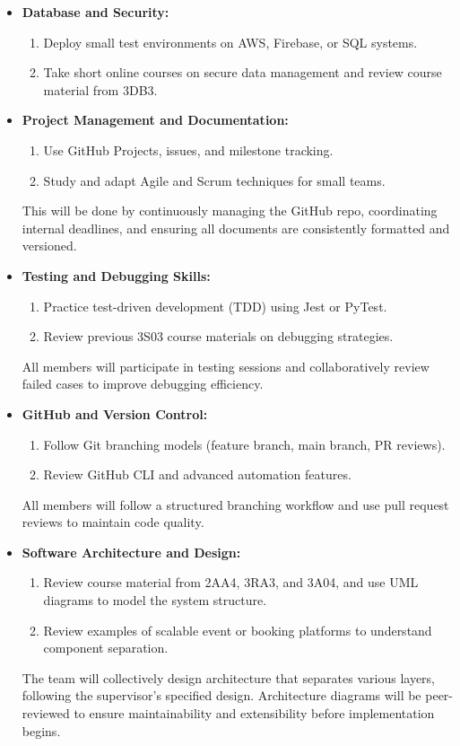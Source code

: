 \begin{enumerate}
\begin{itemize}
    \item \textbf{Database and Security:}
      \begin{enumerate}
        \item Deploy small test environments on AWS, Firebase, or SQL systems.
        \item Take short online courses on secure data management and review course material from 3DB3.
      \end{enumerate}

    \item \textbf{Project Management and Documentation:}
      \begin{enumerate}
        \item Use GitHub Projects, issues, and milestone tracking.
        \item Study and adapt Agile and Scrum techniques for small teams.
      \end{enumerate}
      This will be done by continuously managing the GitHub repo, coordinating internal deadlines, and ensuring all documents are consistently formatted and versioned.

    \item \textbf{Testing and Debugging Skills:}
      \begin{enumerate}
        \item Practice test-driven development (TDD) using Jest or PyTest.
        \item Review previous 3S03 course materials on debugging strategies.
      \end{enumerate}
      All members will participate in testing sessions and collaboratively review failed cases to improve debugging efficiency.

    \item \textbf{GitHub and Version Control:}
      \begin{enumerate}
        \item Follow Git branching models (feature branch, main branch, PR reviews).
        \item Review GitHub CLI and advanced automation features.
      \end{enumerate}
      All members will follow a structured branching workflow and use pull request reviews to maintain code quality.

    \item \textbf{Software Architecture and Design:}
      \begin{enumerate}
        \item Review course material from 2AA4, 3RA3, and 3A04, and use UML diagrams to model the system structure.
        \item Review examples of scalable event or booking platforms to understand component separation.
      \end{enumerate}
      The team will collectively design architecture that separates various layers, following the supervisor’s specified design. Architecture diagrams will be peer-reviewed to ensure maintainability and extensibility before implementation begins.
  \end{itemize}

\end{enumerate}
